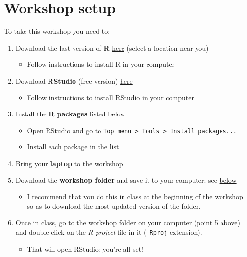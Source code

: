 \documentclass[
]{book}
\providecommand{\tightlist}{%
  \setlength{\itemsep}{0pt}\setlength{\parskip}{0pt}}
\begin{document}
\hypertarget{setup}{%
\section{Workshop setup}\label{setup}}

To take this workshop you need to:

\begin{enumerate}
\def\labelenumi{\arabic{enumi}.}
\tightlist
\item
  Download the last version of \textbf{R} \href{https://cran.r-project.org/mirrors.html}{here} (select a location near you)

  \begin{itemize}
  \tightlist
  \item
    Follow instructions to install R in your computer
  \end{itemize}
\item
  Download \textbf{RStudio} (free version) \href{https://www.rstudio.com/products/rstudio/download/}{here}

  \begin{itemize}
  \tightlist
  \item
    Follow instructions to install RStudio in your computer
  \end{itemize}
\item
  Install the \textbf{R packages} listed \protect\hyperlink{packages}{below}

  \begin{itemize}
  \tightlist
  \item
    Open RStudio and go to \texttt{Top\ menu\ \textgreater{}\ Tools\ \textgreater{}\ Install\ packages...}
  \item
    Install each package in the list
  \end{itemize}
\item
  Bring your \textbf{laptop} to the workshop
\item
  Download the \textbf{workshop folder} and save it to your computer: see \protect\hyperlink{materials}{below}

  \begin{itemize}
  \tightlist
  \item
    I recommend that you do this in class at the beginning of the workshop so as to download the most updated version of the folder.
  \end{itemize}
\item
  Once in class, go to the workshop folder on your computer (point 5 above) and double-click on the \emph{R project} file in it (\texttt{.Rproj} extension).

  \begin{itemize}
  \tightlist
  \item
    That will open RStudio: you're all set!
  \end{itemize}
\end{enumerate}
\end{document}
